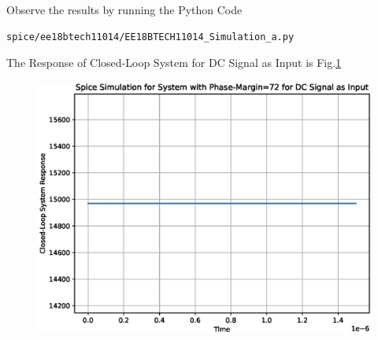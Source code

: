 \begin{enumerate}[label=\thesection.\arabic*.,ref=\thesection.\theenumi]
Observe the results by running the Python Code
\begin{lstlisting}
spice/ee18btech11014/EE18BTECH11014_Simulation_a.py
\end{lstlisting}

The Response of Closed-Loop System for DC Signal as Input is Fig.\ref{fig:DC}
\begin{figure}[ht!]
	\begin{center}
		\includegraphics[width=\columnwidth]{./figs/ee18btech11014/ee18btech11014_Spice_Result_PM=72.eps}
	\end{center}
	\caption{}
	\label{fig:DC}
\end{figure}

\end{enumerate}
